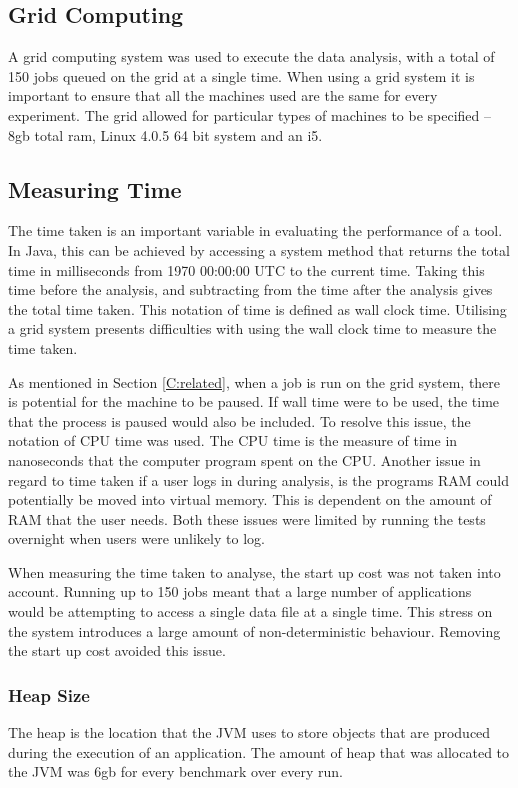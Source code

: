 \subsection{Grid Computing}
A grid computing system was used to execute the data analysis, with a total of 150 jobs queued on the grid at a single time. When using a grid system it is important to ensure that all the machines used are the same for every experiment. The grid allowed for particular types of machines to be specified -- 8gb total ram, Linux 4.0.5 64 bit system and an i5.

\subsection{Measuring Time}
The time taken is an important variable in evaluating the performance of a tool. In Java, this can be achieved by accessing a system method that returns the total time in milliseconds from 1970 00:00:00 UTC to the current time. Taking this time before the analysis, and subtracting from the time after the analysis gives the total time taken. This notation of time is defined as wall clock time. Utilising a grid system presents difficulties with using the wall clock time to measure the time taken. 

As mentioned in Section \ref{C:related}, when a job is run on the grid system, there is potential for the machine to be paused. If wall time were to be used, the time that the process is paused would also be included. To resolve this issue, the notation of CPU time was used. The CPU time is the measure of time in nanoseconds that the computer program spent on the CPU. Another issue in regard to time taken if a user logs in during analysis, is the programs RAM could potentially be moved into virtual memory. This is dependent on the amount of RAM that the user needs. Both these issues were limited by running the tests overnight when users were unlikely to log.

When measuring the time taken to analyse, the start up cost was not taken into account. Running up to 150 jobs meant that a large number of applications would be attempting to access a single data file at a single time. This stress on the system introduces a large amount of non-deterministic behaviour. Removing the start up cost avoided this issue.

\subsubsection{Heap Size}
The heap is the location that the JVM uses to store objects that are produced during the execution of an application. The amount of heap that was allocated to the JVM was 6gb for every benchmark over every run.

